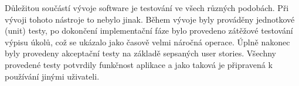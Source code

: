 Důležitou součástí vývoje software je testování ve všech různých podobách. Při vývoji tohoto nástroje to nebylo jinak. Během vývoje byly prováděny jednotkové (unit) testy, po dokončení implementační fáze bylo provedeno zátěžové testování výpisu úkolů, což se ukázalo jako časově velmi náročná operace. Úplně nakonec byly provedeny akceptační testy na základě sepsaných user stories. Všechny provedené testy potvrdily funkčnost aplikace a jako taková je připravená k používání jinými uživateli.